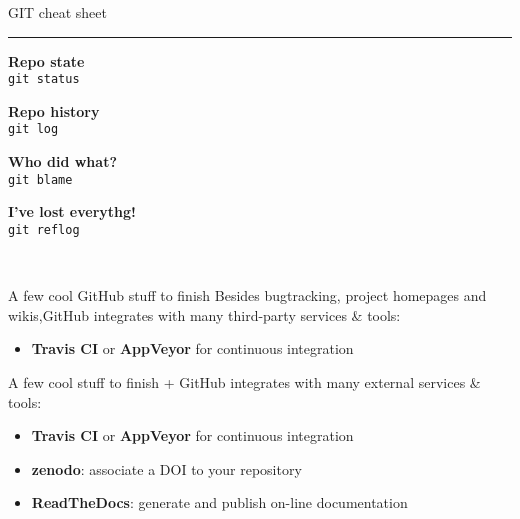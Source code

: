 \documentclass[compress]{beamer}
\begin{document}
\begin{frame}{GIT cheat sheet}
\begin{multicols}{2}
    \rule{\columnwidth}{0.2pt}

    \begin{multicols}{2}
    {\bf Repo state}\\
    \texttt{git status}\par

    {\bf Repo history}\\
    \texttt{git log}\par

    {\bf Who did what?}\\
    \texttt{git blame}\par

    {\bf I've lost everythg!}\\
    \texttt{git reflog}\par


    \end{multicols}

    ~\\

    \end{multicols}

\end{frame}

\begin{frame}{A few cool GitHub stuff to finish}
    Besides bugtracking, project homepages and wikis,GitHub integrates with many
    third-party services \& tools:

    \begin{itemize}
        \item {\bf Travis CI} or {\bf AppVeyor} for continuous integration
    \end{itemize}
\end{frame}


\begin{frame}{A few cool stuff to finish}
    + GitHub integrates with many external services 
    \& tools:

    \begin{itemize}
        \item {\bf Travis CI} or {\bf AppVeyor} for continuous integration
        \item {\bf zenodo}: associate a DOI to your repository
        \item {\bf ReadTheDocs}: generate and publish on-line 
            documentation
    \end{itemize}
\end{frame}
\end{document}
